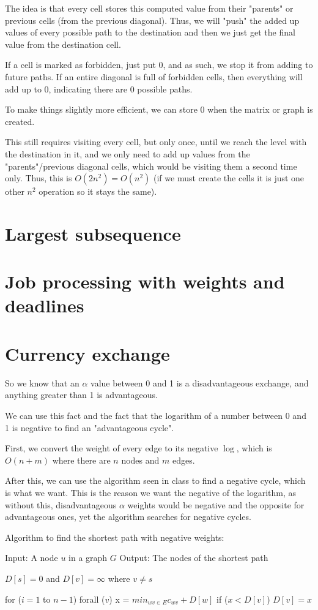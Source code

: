 \documentclass[11pt,letterpaper]{article}
\begin{document}
		The idea is that every cell stores this computed value from their "parents" or previous cells (from the previous diagonal).
		Thus, we will "push" the added up values of every possible path to the destination and then we just get the final value from the destination cell.
		
		If a cell is marked as forbidden, just put 0, and as such, we stop it from adding to future paths. If an entire diagonal is full of forbidden cells, then everything will add up to 0, indicating there are 0 possible paths.
		
		To make things slightly more efficient, we can store 0 when the matrix or graph is created.
		
		This still requires visiting every cell, but only once, until we reach the level with the destination in it, and we only need to add up values from the "parents"/previous diagonal cells, which would be visiting them a second time only. Thus, this is $O(2n^2)=O(n^2)$ (if we must create the cells it is just one other $n^2$ operation so it stays the same).
	
	\section{Largest subsequence}
		
	
	\section{Job processing with weights and deadlines}
		
	
	\section{Currency exchange}
		So we know that an $\alpha$ value between 0 and 1 is a disadvantageous exchange, and anything greater than 1 is advantageous.
		
		We can use this fact and the fact that the logarithm of a number between 0 and 1 is negative to find an "advantageous cycle".
		
		First, we convert the weight of every edge to its negative $\log$, which is $O(n+m)$ where there are $n$ nodes and $m$ edges.
		
		After this, we can use the algorithm seen in class to find a negative cycle, which is what we want. This is the reason we want the negative of the logarithm, as without this, disadvantageous $\alpha$ weights would be negative and the opposite for advantageous ones, yet the algorithm searches for negative cycles.
		\begin{center}
			Algorithm to find the shortest path with negative weights:
		\end{center}
			Input: A node $u$ in a graph $G$\newline
			Output: The nodes of the shortest path
		\begin{algorithm}[caption={}, label={alg1}]
			$D[s] = 0$ and $D[v] = \infty$ where $v \neq s$
			
			for ($i = 1$ to $n-1$)
				forall ($v$)
					x = $min_{wv\in E} c_{wv} +D[w]$
					if ($x < D[v]$)
						$D[v] = x$
		\end{algorithm}
	
\end{document}
